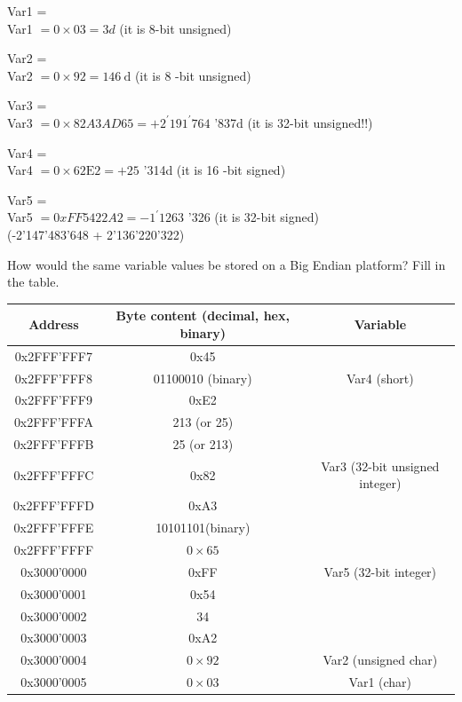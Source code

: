 \documentclass[10pt]{article}
\begin{document}
Var1 =\\
Var1 $=0 \times 03=3 d$ (it is 8-bit unsigned)

Var2 =\\
Var2 $=0 \times 92=146 \mathrm{~d}$ (it is 8 -bit unsigned)

Var3 =\\
Var3 $=0 \times 82 A 3 A D 65=+2^{\prime} 191^{\prime} 764$ '837d (it is 32-bit unsigned!!)

Var4 =\\
Var4 $=0 \times 62 \mathrm{E} 2=+25$ '314d (it is 16 -bit signed)

Var5 =\\
Var5 $=0 x F F 5422 A 2=-1^{\prime} 1263$ '326 (it is 32-bit signed)\\
(-2'147'483'648 + 2'136'220'322)

How would the same variable values be stored on a Big Endian platform? Fill in the table.

\begin{center}
\begin{tabular}{|c|c|c|}
\hline
Address & Byte content (decimal, hex, binary) & Variable \\
\hline
0x2FFF'FFF7 & 0x45 &  \\
\hline
0x2FFF'FFF8 & 01100010 (binary) & Var4 (short) \\
\hline
0x2FFF'FFF9 & 0xE2 &  \\
\hline
0x2FFF'FFFA & 213 (or 25) &  \\
\hline
0x2FFF'FFFB & 25 (or 213) &  \\
\hline
0x2FFF'FFFC & 0x82 & Var3 (32-bit unsigned integer) \\
\hline
0x2FFF'FFFD & 0xA3 &  \\
\hline
0x2FFF'FFFE & 10101101(binary) &  \\
\hline
0x2FFF'FFFF & $0 \times 65$ &  \\
\hline
0x3000'0000 & 0xFF & Var5 (32-bit integer) \\
\hline
0x3000'0001 & 0x54 &  \\
\hline
0x3000'0002 & 34 &  \\
\hline
0x3000'0003 & 0xA2 &  \\
\hline
0x3000'0004 & $0 \times 92$ & Var2 (unsigned char) \\
\hline
0x3000'0005 & $0 \times 03$ & Var1 (char) \\
\hline
\end{tabular}
\end{center}
\end{document}
